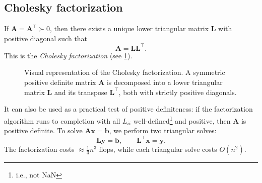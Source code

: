 \subsection{Cholesky factorization}
\label{sec:ch3-cholesky}
If $\mathbf{A}=\mathbf{A}^\top \succ 0$, then there exists a unique lower
triangular matrix $\mathbf{L}$ with positive diagonal such that
\[
  \mathbf{A}=\mathbf{L}\mathbf{L}^\top.
\]
This is the \emph{Cholesky factorization} (see \cref{fig:cholesky_factorization}). 
\begin{figure}[htbp]
\centering
{}
\caption{Visual representation of the Cholesky factorization. A symmetric positive definite matrix $\mathbf{A}$ is decomposed into a lower triangular matrix $\mathbf{L}$ and its transpose $\mathbf{L}^\top$, both with strictly positive diagonals.}
\label{fig:cholesky_factorization}
\end{figure}

It can also be used as a practical
test of positive definiteness: if the factorization algorithm runs to
completion with all $L_{ii}$ well-defined\footnote{i.e., not NaN} and positive,
then $\mathbf{A}$ is positive definite.
To solve $\mathbf{A}\mathbf{x}=\mathbf{b}$, we perform two triangular solves:
\[
  \mathbf{L}\mathbf{y}=\mathbf{b},\qquad \mathbf{L}^\top \mathbf{x}=\mathbf{y}.
\]
The factorization costs $\approx \frac{1}{3}n^3$ flops, while each triangular
solve costs $O(n^2)$.

